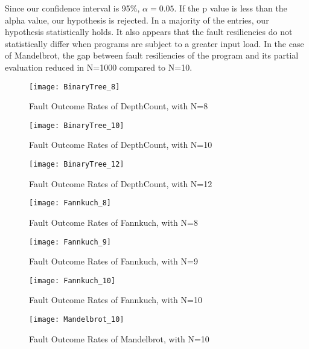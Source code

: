 Since our confidence interval is 95\%, $\alpha=0.05$.
If the p value is less than the alpha value, our hypothesis is rejected.
In a majority of the entries, our hypothesis statistically holds.
It also appears that the fault resiliencies do not statistically differ when programs are subject to a greater input load.
In the case of Mandelbrot, the gap between fault resiliencies of the program and its partial evaluation reduced in N=1000 compared to N=10.

\begin{figure}[htbp]
  \centering
  \texttt{[image: BinaryTree\_8]}
  \caption{Fault Outcome Rates of DepthCount, with N=8}
  \label{fig:BinaryTree_8}
\end{figure}

\begin{figure}[htbp]
  \centering
  \texttt{[image: BinaryTree\_10]}
  \caption{Fault Outcome Rates of DepthCount, with N=10}
  \label{fig:BinaryTree_10}
\end{figure}

\begin{figure}[htbp]
  \centering
  \texttt{[image: BinaryTree\_12]}
  \caption{Fault Outcome Rates of DepthCount, with N=12}
  \label{fig:BinaryTree_12}
\end{figure}

\begin{figure}[htbp]
  \centering
  \texttt{[image: Fannkuch\_8]}
  \caption{Fault Outcome Rates of Fannkuch, with N=8}
  \label{fig:Fannkuch_8}
\end{figure}

\begin{figure}[htbp]
  \centering
  \texttt{[image: Fannkuch\_9]}
  \caption{Fault Outcome Rates of Fannkuch, with N=9}
  \label{fig:Fannkuch_9}
\end{figure}

\begin{figure}[htbp]
  \centering
  \texttt{[image: Fannkuch\_10]}
  \caption{Fault Outcome Rates of Fannkuch, with N=10}
  \label{fig:Fannkuch_10}
\end{figure}

\begin{figure}[htbp]
  \centering
  \texttt{[image: Mandelbrot\_10]}
  \caption{Fault Outcome Rates of Mandelbrot, with N=10}
  \label{fig:Mandelbrot_10}
\end{figure}

